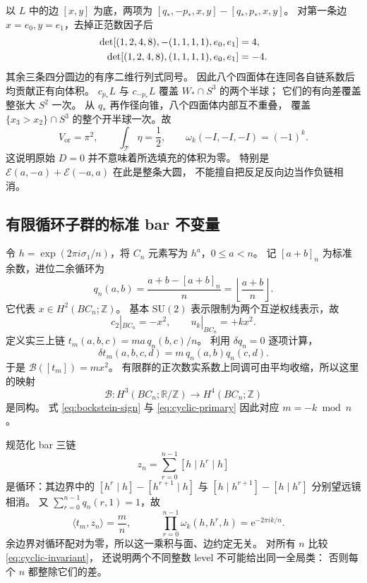 \documentclass[UTF8,11pt,fontset=none]{ctexart}
\numberwithin{equation}{section}
\theoremstyle{definition}
\newcommand{\R}{\mathbb R}
\newcommand{\Z}{\mathbb Z}
\newcommand{\ee}{\mathrm e}
\newcommand{\SU}{\mathrm{SU}(2)}
\newcommand{\Id}{I}
\newcommand{\Vor}{V_{\mathrm{or}}}
\begin{document}
以 $L$ 中的边 $[x,y]$ 为底，两项为
$[q_*,-p_*,x,y]-[q_*,p_*,x,y]$。
对第一条边 $x=e_0,y=e_1$，去掉正范数因子后
\begin{align}
 \det[(1,2,4,8),-(1,1,1,1),e_0,e_1]&=4,\notag\\
 \det[(1,2,4,8),(1,1,1,1),e_0,e_1]&=-4.
 \label{eq:center-determinants}
\end{align}
其余三条四分圆边的有序二维行列式同号。
因此八个四面体在连同各自链系数后均贡献正有向体积。
$c_{p_*}L$ 与 $c_{-p_*}L$ 覆盖 $W_*\cap S^3$ 的两个半球；
它们的有向差覆盖整张大 $S^2$ 一次。
从 $q_*$ 再作径向锥，八个四面体内部互不重叠，
覆盖 $\{x_3>x_2\}\cap S^3$ 的整个开半球一次。故
\begin{equation}
 \Vor=\pi^2,\qquad \int_{\mathcal T}\eta=\frac12,\qquad
 \boxed{\omega_k(-\Id,-\Id,-\Id)=(-1)^k.}
 \label{eq:center-phase}
\end{equation}
这说明原始 $D=0$ 并不意味着所选填充的体积为零。
特别是 $\mathcal E(a,-a)+\mathcal E(-a,a)$ 在此是整条大圆，
不能擅自把反足反向边当作负链相消。

\subsection{有限循环子群的标准 bar 不变量}

令 $h=\exp(2\pi i\sigma_1/n)$，将 $C_n$ 元素写为 $h^a$，$0\le a<n$。
记 $[a+b]_n$ 为标准余数，进位二余循环为
\begin{equation}
 q_n(a,b)=\frac{a+b-[a+b]_n}{n}
 =\left\lfloor\frac{a+b}{n}\right\rfloor.
 \label{eq:carry}
\end{equation}
它代表 $x\in H^2(BC_n;\Z)$。
基本 $\SU$ 表示限制为两个互逆权线表示，故
\begin{equation}
 c_2|_{BC_n}=-x^2,\qquad u_k|_{BC_n}=+kx^2.
 \label{eq:cyclic-primary}
\end{equation}
定义实三上链 $t_m(a,b,c)=ma\,q_n(b,c)/n$。
利用 $\delta q_n=0$ 逐项计算，
\begin{equation}
 \delta t_m(a,b,c,d)=m\,q_n(a,b)q_n(c,d).
 \label{eq:cyclic-coboundary}
\end{equation}
于是 $\mathcal B([t_m])=mx^2$。
有限群的正次数实系数上同调可由平均收缩，所以这里的映射
\[
 \mathcal B:H^3(BC_n;\R/\Z)\longrightarrow H^4(BC_n;\Z)
\]
是同构。
式 \eqref{eq:bockstein-sign} 与 \eqref{eq:cyclic-primary}
因此对应 $m=-k\bmod n$。

规范化 bar 三链
\begin{equation}
 z_n=\sum_{r=0}^{n-1}[h\mid h^r\mid h]
 \label{eq:cyclic-cycle}
\end{equation}
是循环：其边界中的
$[h^r\mid h]-[h^{r+1}\mid h]$ 与
$[h\mid h^{r+1}]-[h\mid h^r]$ 分别望远镜相消。
又 $\sum_{r=0}^{n-1}q_n(r,1)=1$，故
\begin{equation}
 \langle t_m,z_n\rangle=\frac mn,\qquad
 \boxed{\quad
 \prod_{r=0}^{n-1}\omega_k(h,h^r,h)=\ee^{-2\pi ik/n}.
 \quad}
 \label{eq:cyclic-invariant}
\end{equation}
余边界对循环配对为零，所以这一乘积与面、边约定无关。
对所有 $n$ 比较 \eqref{eq:cyclic-invariant}，
还说明两个不同整数 level 不可能给出同一全局类：
否则每个 $n$ 都整除它们的差。
\end{document}
